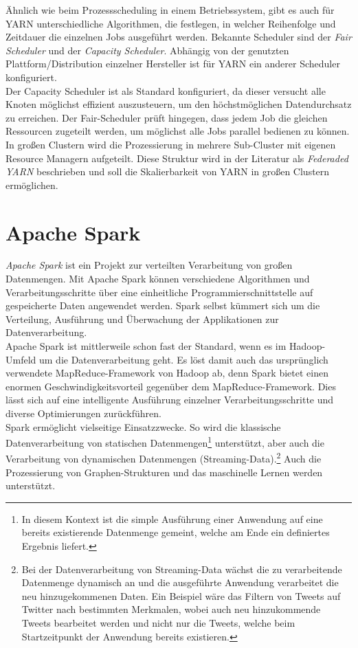 \noindent
Ähnlich wie beim Prozessscheduling in einem Betriebssystem, gibt es auch für YARN unterschiedliche Algorithmen, die festlegen, in welcher Reihenfolge und Zeitdauer die einzelnen Jobs ausgeführt werden. Bekannte Scheduler sind der \textit{Fair Scheduler} und der \textit{Capacity Scheduler}. Abhängig von der genutzten Plattform/Distribution einzelner Hersteller ist für YARN ein anderer Scheduler konfiguriert.\\
Der Capacity Scheduler ist als Standard konfiguriert, da dieser versucht alle Knoten möglichst effizient auszusteuern, um den höchstmöglichen Datendurchsatz zu erreichen. Der Fair-Scheduler prüft hingegen, dass jedem Job die gleichen Ressourcen zugeteilt werden, um möglichst alle Jobs parallel bedienen zu können.\\

\noindent
In großen Clustern wird die Prozessierung in mehrere Sub-Cluster mit eigenen Resource Managern aufgeteilt. Diese Struktur wird in der Literatur als \textit{Federaded YARN} beschrieben und soll die Skalierbarkeit von YARN in großen Clustern ermöglichen.

\section{Apache Spark}
\label{sec:theory_spark}

\textit{Apache Spark\texttrademark\thinspace} ist ein Projekt zur verteilten Verarbeitung von großen Datenmengen. Mit Apache Spark können verschiedene Algorithmen und Verarbeitungsschritte über eine einheitliche Programmierschnittstelle auf gespeicherte Daten  angewendet werden. Spark selbst kümmert sich um die Verteilung, Ausführung und Überwachung der Applikationen zur Datenverarbeitung.\cite[S. 2]{learning_spark}\\
Apache Spark ist mittlerweile schon fast der Standard, wenn es im Hadoop-Umfeld um die Datenverarbeitung geht. Es löst damit auch das ursprünglich verwendete MapReduce-Framework von Hadoop ab, denn Spark
bietet einen enormen Geschwindigkeitsvorteil gegenüber dem MapReduce-Framework. Dies lässt sich auf eine intelligente Ausführung einzelner Verarbeitungsschritte und diverse Optimierungen zurückführen.\cite[S. 148 ff.]{expert_hadoop_admin}\\

\noindent
Spark ermöglicht vielseitige Einsatzzwecke. So wird die klassische Datenverarbeitung von statischen Datenmengen\footnote{In diesem Kontext ist die simple Ausführung einer Anwendung auf eine bereits existierende Datenmenge gemeint, welche am Ende ein definiertes Ergebnis liefert.} unterstützt, aber auch die Verarbeitung von dynamischen Datenmengen (Streaming-Data).\footnote{Bei der Datenverarbeitung von Streaming-Data wächst die zu verarbeitende Datenmenge dynamisch an und die ausgeführte Anwendung verarbeitet die neu hinzugekommenen Daten. Ein Beispiel wäre das Filtern von Tweets auf Twitter nach bestimmten Merkmalen, wobei auch neu hinzukommende Tweets bearbeitet werden und nicht nur die Tweets, welche beim Startzeitpunkt der Anwendung bereits existieren.} Auch die Prozessierung von Graphen-Strukturen und das maschinelle Lernen werden unterstützt.\cite[S. 152]{expert_hadoop_admin}\\

